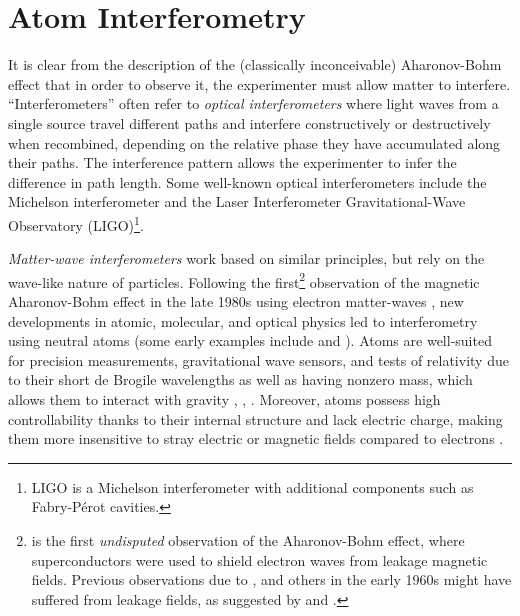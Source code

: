 \documentclass[reprint,
nofootinbib,
amsmath,amssymb,
aps]{revtex4-1}
\begin{document}
\section{Atom Interferometry} \label{sect:atom}

It is clear from the description of the (classically inconceivable) Aharonov-Bohm effect that in order to observe it, the experimenter must allow matter to {interfere}. ``Interferometers'' often refer to \textit{optical interferometers} where light waves from a single source travel different paths and interfere constructively or destructively when recombined, depending on the relative phase they have accumulated along their paths. The interference pattern allows the experimenter to infer the difference in path length. Some well-known optical interferometers include the Michelson interferometer and the Laser Interferometer Gravitational-Wave Observatory (LIGO)\footnote{LIGO is a Michelson interferometer with additional components such as Fabry-P\'{e}rot cavities.}. 


\textit{Matter-wave interferometers} work based on similar principles, but rely on the wave-like nature of particles. Following the first\footnote{\cite{tonomura1986evidence} is the first \textit{undisputed} observation of the Aharonov-Bohm effect, where superconductors were used to shield electron waves from leakage magnetic fields. Previous observations due to \cite{chambers1960shift}, \cite{fowler1961electron} and others in the early 1960s might have suffered from leakage fields, as suggested by \cite{bocchieri1978nonexistence} and \cite{roy1980condition}.   } observation of the magnetic Aharonov-Bohm effect in the late 1980s using electron matter-waves \cite{tonomura1986evidence}, new developments in atomic, molecular, and optical physics led to interferometry using neutral atoms (some early examples include \cite{keith1991interferometer} and \cite{carnal1991young}). Atoms are well-suited for precision measurements, gravitational wave sensors, and tests of relativity due to their short de Brogile wavelengths as well as having nonzero mass, which allows them to interact with gravity \cite{mueller2014quantum}, \cite{dimopoulos2009gravitational}, \cite{stray2022quantum}. Moreover, atoms possess high controllability thanks to their internal structure and lack electric charge, making them more insensitive to stray electric or magnetic fields compared to electrons \cite{bongs2019taking}. 
\end{document}
